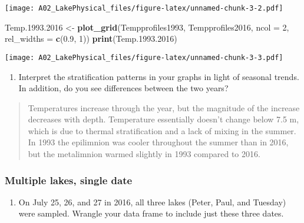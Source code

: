 \documentclass[]{article}
\newenvironment{Shaded}{\begin{snugshade}}{\end{snugshade}}
\newcommand{\DataTypeTok}[1]{\textcolor[rgb]{0.13,0.29,0.53}{#1}}
\newcommand{\DecValTok}[1]{\textcolor[rgb]{0.00,0.00,0.81}{#1}}
\newcommand{\FloatTok}[1]{\textcolor[rgb]{0.00,0.00,0.81}{#1}}
\newcommand{\KeywordTok}[1]{\textcolor[rgb]{0.13,0.29,0.53}{\textbf{#1}}}
\newcommand{\NormalTok}[1]{#1}
\newcommand{\StringTok}[1]{\textcolor[rgb]{0.31,0.60,0.02}{#1}}
\providecommand{\tightlist}{%
  \setlength{\itemsep}{0pt}\setlength{\parskip}{0pt}}
\begin{document}
\texttt{[image: A02\_LakePhysical\_files/figure-latex/unnamed-chunk-3-2.pdf]}

\begin{Shaded}
\begin{Highlighting}[]
\NormalTok{Temp.}\FloatTok{1993.2016}\NormalTok{ <-}\StringTok{ }
\StringTok{  }\KeywordTok{plot_grid}\NormalTok{(Tempprofiles1993, Tempprofiles2016, }
            \DataTypeTok{ncol =} \DecValTok{2}\NormalTok{, }\DataTypeTok{rel_widths =} \KeywordTok{c}\NormalTok{(}\FloatTok{0.9}\NormalTok{, }\DecValTok{1}\NormalTok{))}
\KeywordTok{print}\NormalTok{(Temp.}\FloatTok{1993.2016}\NormalTok{)}
\end{Highlighting}
\end{Shaded}

\texttt{[image: A02\_LakePhysical\_files/figure-latex/unnamed-chunk-3-3.pdf]}

\begin{enumerate}
\def\labelenumi{\arabic{enumi}.}
\setcounter{enumi}{6}
\tightlist
\item
  Interpret the stratification patterns in your graphs in light of
  seasonal trends. In addition, do you see differences between the two
  years?
\end{enumerate}

\begin{quote}
Temperatures increase through the year, but the magnitude of the
increase decreases with depth. Temperature essentially doesn't change
below 7.5 m, which is due to thermal stratification and a lack of mixing
in the summer. In 1993 the epilimnion was cooler throughout the summer
than in 2016, but the metalimnion warmed slightly in 1993 compared to
2016.
\end{quote}

\hypertarget{multiple-lakes-single-date}{%
\subsubsection{Multiple lakes, single
date}\label{multiple-lakes-single-date}}

\begin{enumerate}
\def\labelenumi{\arabic{enumi}.}
\setcounter{enumi}{7}
\tightlist
\item
  On July 25, 26, and 27 in 2016, all three lakes (Peter, Paul, and
  Tuesday) were sampled. Wrangle your data frame to include just these
  three dates.
\end{enumerate}
\end{document}
